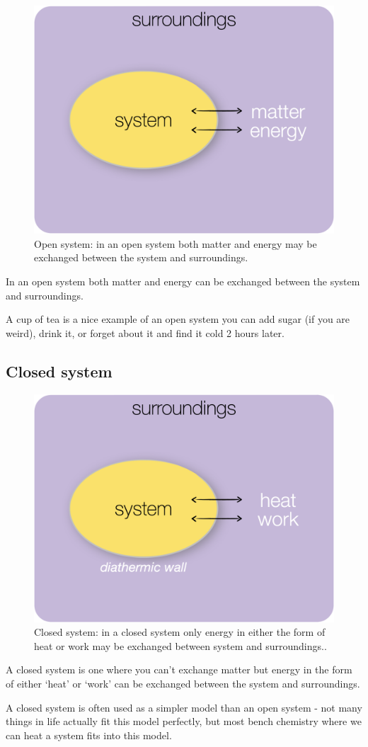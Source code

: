 \documentclass[
]{book}
\begin{document}
\begin{figure}

{\centering \includegraphics[width=0.3\linewidth]{images/open} 

}

\caption{Open system: in an open system both matter and energy may be exchanged between the system and surroundings.}\label{fig:open}
\end{figure}

In an open system both matter and energy can be exchanged between the system and surroundings.

A cup of tea is a nice example of an open system you can add sugar (if you are weird), drink it, or forget about it and find it cold 2 hours later.

\hypertarget{subsec:closed}{%
\subsection{Closed system}\label{subsec:closed}}

\begin{figure}

{\centering \includegraphics[width=0.3\linewidth]{images/closed} 

}

\caption{Closed system: in a closed system only energy in either the form of heat or work may be exchanged between system and surroundings..}\label{fig:closed}
\end{figure}

A closed system is one where you can't exchange matter but energy in the form of either `heat' or `work' can be exchanged between the system and surroundings.

A closed system is often used as a simpler model than an open system - not many things in life actually fit this model perfectly, but most bench chemistry where we can heat a system fits into this model.
\end{document}
